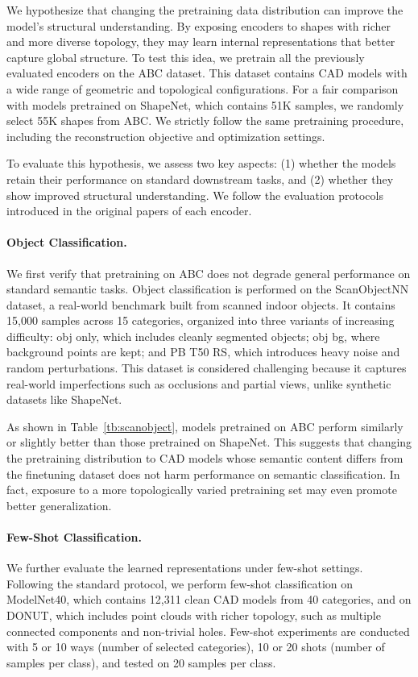 
We hypothesize that changing the pretraining data distribution can improve the model's structural understanding. By exposing encoders to shapes with richer and more diverse topology, they may learn internal representations that better capture global structure. To test this idea, we pretrain all the previously evaluated encoders on the ABC dataset. This dataset contains CAD models with a wide range of geometric and topological configurations. For a fair comparison with models pretrained on ShapeNet, which contains 51K samples, we randomly select 55K shapes from ABC. We strictly follow the same pretraining procedure, including the reconstruction objective and optimization settings.

To evaluate this hypothesis, we assess two key aspects: (1) whether the models retain their performance on standard downstream tasks, and (2) whether they show improved structural understanding. We follow the evaluation protocols introduced in the original papers of each encoder.

\paragraph{Object Classification.}
We first verify that pretraining on ABC does not degrade general performance on standard semantic tasks. Object classification is performed on the ScanObjectNN dataset, a real-world benchmark built from scanned indoor objects. It contains 15,000 samples across 15 categories, organized into three variants of increasing difficulty: obj only, which includes cleanly segmented objects; obj bg, where background points are kept; and PB T50 RS, which introduces heavy noise and random perturbations. This dataset is considered challenging because it captures real-world imperfections such as occlusions and partial views, unlike synthetic datasets like ShapeNet.

As shown in Table~\ref{tb:scanobject}, models pretrained on ABC perform similarly or slightly better than those pretrained on ShapeNet. This suggests that changing the pretraining distribution to CAD models whose semantic content differs from the finetuning dataset does not harm performance on semantic classification. In fact, exposure to a more topologically varied pretraining set may even promote better generalization.



\paragraph{Few-Shot Classification.}
We further evaluate the learned representations under few-shot settings. Following the standard protocol, we perform few-shot classification on ModelNet40, which contains 12,311 clean CAD models from 40 categories, and on DONUT, which includes point clouds with richer topology, such as multiple connected components and non-trivial holes. Few-shot experiments are conducted with 5 or 10 ways (number of selected categories), 10 or 20 shots (number of samples per class), and tested on 20 samples per class.

